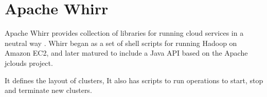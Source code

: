 \section{Apache Whirr}

Apache Whirr provides collection of libraries for running cloud services in a
neutral way . Whirr began as a set of shell scripts for running Hadoop on Amazon
EC2, and later matured to include a Java API based on the Apache jclouds
project.

It defines the layout of clusters, It also has scripts to run operations to
start, stop and terminate new clusters\cite{hid- sp18-421-whirrCloud}.

